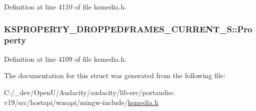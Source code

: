 Definition at line 4110 of file ksmedia.\+h.

\subsubsection[{\texorpdfstring{Property}{Property}}]{ K\+S\+P\+R\+O\+P\+E\+R\+T\+Y\+\_\+\+D\+R\+O\+P\+P\+E\+D\+F\+R\+A\+M\+E\+S\+\_\+\+C\+U\+R\+R\+E\+N\+T\+\_\+\+S\+::\+Property}\hypertarget{struct_k_s_p_r_o_p_e_r_t_y___d_r_o_p_p_e_d_f_r_a_m_e_s___c_u_r_r_e_n_t___s_a3f6ca0258e95d6705e2224321e5a1370}{}\label{struct_k_s_p_r_o_p_e_r_t_y___d_r_o_p_p_e_d_f_r_a_m_e_s___c_u_r_r_e_n_t___s_a3f6ca0258e95d6705e2224321e5a1370}


Definition at line 4109 of file ksmedia.\+h.



The documentation for this struct was generated from the following file\+:\begin{DoxyCompactItemize}
\item 
C\+:/\+\_\+dev/\+Open\+U/\+Audacity/audacity/lib-\/src/portaudio-\/v19/src/hostapi/wasapi/mingw-\/include/\hyperlink{ksmedia_8h}{ksmedia.\+h}\end{DoxyCompactItemize}
